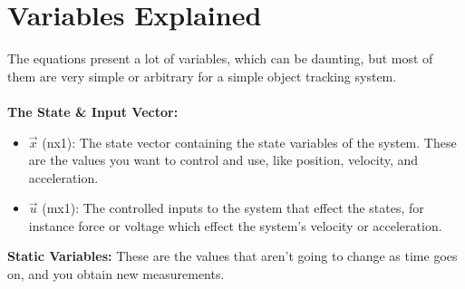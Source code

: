 \documentclass{article} %
\begin{document}
\section{Variables Explained}
The equations present a lot of variables, which can be daunting, but most of them are very simple or arbitrary for a simple object tracking system. \\\\
\textbf{The State \& Input Vector:}
\begin{itemize}
\item $\vec{x}$ (nx1): The state vector containing the state variables of the system. These are the values you want to control and use, like position, velocity, and acceleration. 
\item $\vec{u}$ (mx1): The controlled inputs to the system that effect the states, for instance force or voltage which effect the system's velocity or acceleration.
\end{itemize}
\textbf{Static Variables:}
These are the values that aren't going to change as time goes on, and you obtain new measurements. 
\end{document}

